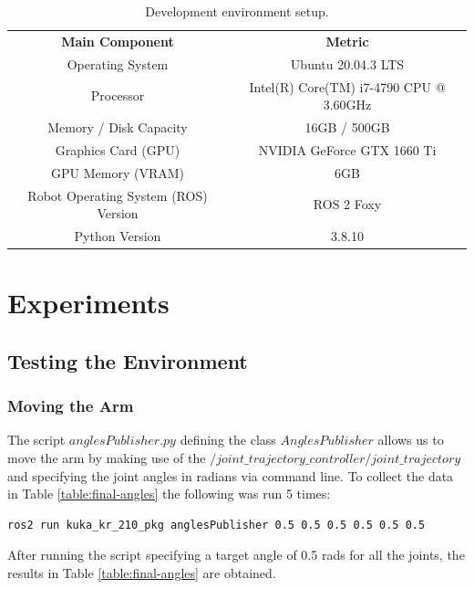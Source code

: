 \documentclass[12pt,oneside]{article}
\begin{document}
\begin{table}[H]
\centering
\begin{tabular}{ | c | c | }
\hline
\rowcolor{gray!50}
\multicolumn{2}{|c|}{\textbf{Environment Setup}} \\
\hline
\rowcolor{gray!25}
\textbf{Main Component} & \textbf{Metric} \\
\hline
Operating System & Ubuntu 20.04.3 LTS \\
\rowcolor{gray!10}
Processor & Intel(R) Core(TM) i7-4790 CPU @ 3.60GHz \\
Memory / Disk Capacity & 16GB / 500GB \\
\rowcolor{gray!10}
Graphics Card (GPU) & NVIDIA GeForce GTX 1660 Ti \\
GPU Memory (VRAM) & 6GB \\
\rowcolor{gray!10}
Robot Operating System
(ROS) Version & ROS 2 Foxy \\
Python Version & 3.8.10 \\

\hline
\end{tabular}
\caption{Development environment setup.}
\label{table:hardware-specs}
\end{table}





\section{Experiments}\label{sec:exp}
\subsection{Testing the Environment}
\subsubsection{Moving the Arm}
The script $anglesPublisher.py$ defining the class $AnglesPublisher$ allows us to move the arm by making use of the $/joint\_trajectory\_controller/joint\_trajectory$ and specifying the joint angles in radians via command line. To collect the data in Table \ref{table:final-angles} the following was run 5 times:
\begin{verbatim}
ros2 run kuka_kr_210_pkg anglesPublisher 0.5 0.5 0.5 0.5 0.5 0.5
\end{verbatim}
After running the script specifying a target angle of 0.5 rads for all the joints, the results in Table \ref{table:final-angles} are obtained.
\end{document}
